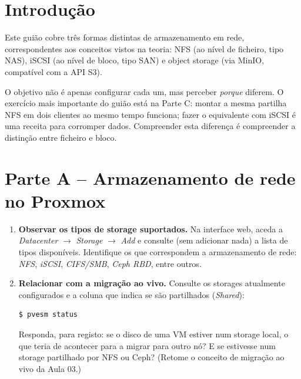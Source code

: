 \documentclass[11pt,a4paper]{article}
\begin{document}
\section{Introdução}
Este guião cobre três formas distintas de armazenamento em rede, correspondentes aos conceitos vistos na teoria: NFS (ao nível de ficheiro, tipo NAS), iSCSI (ao nível de bloco, tipo SAN) e object storage (via MinIO, compatível com a API S3).

O objetivo não é apenas configurar cada um, mas perceber \emph{porque} diferem. O exercício mais importante do guião está na Parte C: montar a mesma partilha NFS em dois clientes ao mesmo tempo funciona; fazer o equivalente com iSCSI é uma receita para corromper dados. Compreender esta diferença é compreender a distinção entre ficheiro e bloco.

\section{Parte A -- Armazenamento de rede no Proxmox}
\begin{enumerate}[label=\arabic*.]
    \item \textbf{Observar os tipos de storage suportados.} Na interface web, aceda a \emph{Datacenter} $\rightarrow$ \emph{Storage} $\rightarrow$ \emph{Add} e consulte (sem adicionar nada) a lista de tipos disponíveis. Identifique os que correspondem a armazenamento de rede: \emph{NFS}, \emph{iSCSI}, \emph{CIFS/SMB}, \emph{Ceph RBD}, entre outros.

    \item \textbf{Relacionar com a migração ao vivo.} Consulte os storages atualmente configurados e a coluna que indica se são partilhados (\emph{Shared}):
\begin{lstlisting}
$ pvesm status
\end{lstlisting}
    Responda, para registo: se o disco de uma VM estiver num storage local, o que teria de acontecer para a migrar para outro nó? E se estivesse num storage partilhado por NFS ou Ceph? (Retome o conceito de migração ao vivo da Aula 03.)
\end{enumerate}
\end{document}

